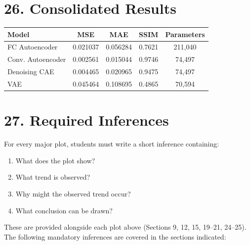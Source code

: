 \documentclass[10pt]{article}
\begin{document}
\section*{26. Consolidated Results}

\begin{center}
\begin{tabular}{|l|c|c|c|c|}
\hline
Model & MSE & MAE & SSIM & Parameters \\
\hline
FC Autoencoder    & 0.021037 & 0.056284 & 0.7621 & 211{,}040 \\
Conv. Autoencoder & 0.002561 & 0.015044 & 0.9746 & 74{,}497  \\
Denoising CAE     & 0.004465 & 0.020965 & 0.9475 & 74{,}497  \\
VAE               & 0.045464 & 0.108695 & 0.4865 & 70{,}594  \\
\hline
\end{tabular}
\end{center}


\section*{27. Required Inferences}

For every major plot, students must write a short inference containing:

\begin{enumerate}
\item What does the plot show?
\item What trend is observed?
\item Why might the observed trend occur?
\item What conclusion can be drawn?
\end{enumerate}

These are provided alongside each plot above (Sections 9, 12, 15, 19--21,
24--25). The following mandatory inferences are covered in the sections
indicated:
\end{document}
